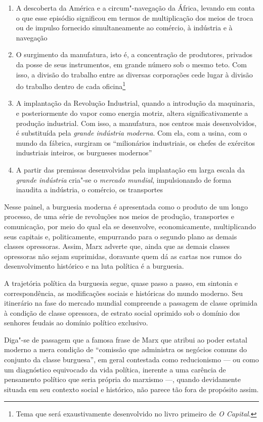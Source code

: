 \begin{enumerate}
\item A
descoberta da América e a circum"-navegação da África, levando em conta o
que esse episódio significou em termos de multiplicação dos meios de
troca ou de impulso fornecido simultaneamente ao comércio, à indústria
e à navegação
\item O surgimento da manufatura, isto é, a concentração
de produtores, privados da posse de seus instrumentos, em grande número
sob o mesmo teto. Com isso, a divisão do trabalho entre as diversas
corporações cede lugar à divisão do trabalho dentro de cada oficina\footnote{Tema que será exaustivamente desenvolvido no livro primeiro de
\textit{O Capital}.}
\item A implantação da Revolução Industrial, quando
a introdução da maquinaria, e posteriormente do vapor como energia
motriz, altera significativamente a produção industrial. Com isso, a
manufatura, nos centros mais desenvolvidos, é substituída pela \textit{grande
indústria moderna}. Com ela, com a usina, com o mundo da fábrica,
surgiram os ``milionários industriais, os chefes de exércitos
industriais inteiros, os burgueses modernos''
\item A partir das
premissas desenvolvidas pela implantação em larga escala da \textit{grande
indústria} cria"-se o \textit{mercado mundial}, impulsionando de forma
inaudita a indústria, o comércio, os transportes
\end{enumerate}

Nesse painel, a burguesia moderna é apresentada como o produto de um
longo processo, de uma série de revoluções nos meios de produção,
transportes e comunicação, por meio do qual ela se desenvolve,
economicamente, multiplicando seus capitais e, politicamente,
empurrando para o segundo plano as demais classes opressoras. Assim,
Marx adverte que, ainda que as demais classes opressoras não sejam
suprimidas, doravante quem dá as cartas nos rumos do desenvolvimento
histórico e na luta política é a burguesia.

A trajetória política da burguesia segue, quase passo a passo, em
sintonia e correspondência, as modificações sociais e históricas do
mundo moderno. Seu itinerário na fase do mercado mundial compreende a passagem de classe oprimida
à condição de classe opressora, de estrato social oprimido sob o
domínio dos senhores feudais ao domínio político exclusivo.

Diga"-se de passagem que a famosa frase de Marx que atribui ao poder
estatal moderno a mera condição de ``comissão que administra os negócios
comuns do conjunto da classe burguesa'', em geral contestada como
reducionismo --- ou como um diagnóstico equivocado da vida política,
inerente a uma carência de pensamento político que seria própria do
marxismo ---, quando devidamente situada em seu contexto social e
histórico, não parece tão fora de propósito assim.

